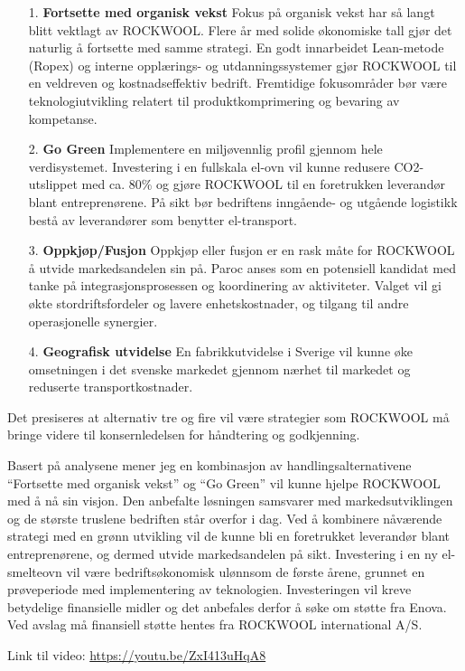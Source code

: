 \begin{itemize}
\item[1.]\textbf{Fortsette med organisk vekst}
\indent \newline
Fokus på organisk vekst har så langt blitt vektlagt av ROCKWOOL. Flere år med solide økonomiske tall gjør det naturlig å fortsette med samme strategi. En godt innarbeidet Lean-metode (Ropex) og interne opplærings- og utdanningssystemer gjør ROCKWOOL til en veldreven og kostnadseffektiv bedrift. Fremtidige fokusområder bør være teknologiutvikling relatert til produktkomprimering og bevaring av kompetanse. 

\item[2.]\textbf{Go Green}
\indent \newline
Implementere en miljøvennlig profil gjennom hele verdisystemet. Investering i en fullskala el-ovn vil kunne redusere CO2-utslippet med ca. 80\% og gjøre ROCKWOOL til en foretrukken leverandør blant entreprenørene. På sikt bør bedriftens inngående- og utgående logistikk bestå av leverandører som benytter el-transport.

\item[3.]\textbf{Oppkjøp/Fusjon}
\indent \newline
Oppkjøp eller fusjon er en rask måte for ROCKWOOL å utvide markedsandelen sin på. Paroc anses som en potensiell kandidat med tanke på integrasjonsprosessen og koordinering av aktiviteter. Valget vil gi økte stordriftsfordeler og lavere enhetskostnader, og tilgang til andre operasjonelle synergier.

\item[4.]\textbf{Geografisk utvidelse}
\indent \newline
En fabrikkutvidelse i Sverige vil kunne øke omsetningen i det svenske markedet gjennom nærhet til markedet og reduserte transportkostnader.
\end{itemize}
\indent
Det presiseres at alternativ tre og fire vil være strategier som ROCKWOOL må bringe videre til konsernledelsen for håndtering og godkjenning.

\indent \newline
Basert på analysene mener jeg en kombinasjon av handlingsalternativene “Fortsette med organisk vekst” og “Go Green” vil kunne hjelpe ROCKWOOL med å nå sin visjon. Den anbefalte løsningen samsvarer med markedsutviklingen og de største truslene bedriften står overfor i dag. Ved å kombinere nåværende strategi med en grønn utvikling vil de kunne bli en foretrukket leverandør blant entreprenørene, og dermed utvide markedsandelen på sikt. Investering i en ny el-smelteovn vil være bedriftsøkonomisk ulønnsom de første årene, grunnet en prøveperiode med implementering av teknologien. Investeringen vil kreve betydelige finansielle midler og det anbefales derfor å søke om støtte fra Enova. Ved avslag må finansiell støtte hentes fra ROCKWOOL international A/S. 

\indent \newline
Link til video: \href{https://youtu.be/ZxI413uHqA8}{https://youtu.be/ZxI413uHqA8}
